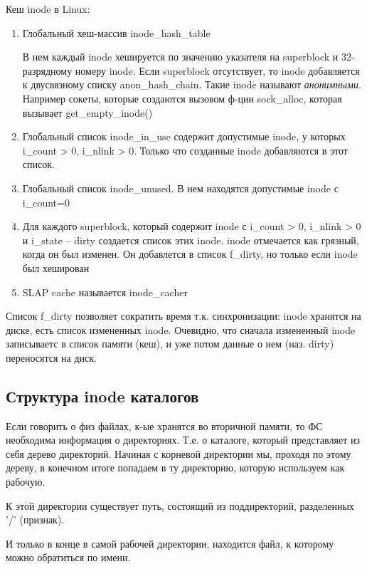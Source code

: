 Кеш inode в Linux:
\begin{enumerate}
    \item Глобальный хеш-массив inode\_hash\_table

    В нем каждый inode хешируется по значению указателя на superblock и 32-разрядному номеру inode. Если superblock отсутствует, то inode добавляется к двусвязному списку anon\_hash\_chain. Такие inode называют \textit{анонимными}. Например сокеты, которые создаются вызовом ф-ции sock\_alloc, которая вызывает get\_empty\_inode()

    \item Глобальный список inode\_in\_use содержит допустимые inode, у которых i\_count > 0, i\_nlink > 0.
    Только что созданные inode добавляются в этот список.

    \item Глобальный список inode\_unused. В нем находятся допустимые inode с i\_count=0

    \item Для каждого superblock, который содержит inode с i\_count > 0, i\_nlink > 0 и i\_state -- dirty создается список этих inode. inode отмечается как грязный, когда он был изменен. Он добавлется в список f\_dirty, но только если inode был хеширован

    \item SLAP cache называется inode\_cacher
    
\end{enumerate}

Список f\_dirty позволяет сократить время т.к. синхронизации: inode хранятся на диске, есть список измененных inode. Очевидно, что сначала измененный inode записываетс в список памяти (кеш), и уже потом данные о нем (наз. dirty) переносятся на диск.

\subsection{Структура inode каталогов}

Если говорить о физ файлах, к-ые хранятся во вторичной памяти, то ФС необходима информация о директориях. Т.е. о каталоге, который представляет из себя дерево директорий. Начиная с корневой директории мы, проходя по этому дереву, в конечном итоге попадаем в ту директорию, которую используем как рабочую.

К этой директории существует путь, состоящий из поддиректорий, разделенных '/' (признак).

И только в конце в самой рабочей директории, находится файл, к которому можно обратиться по имени.


